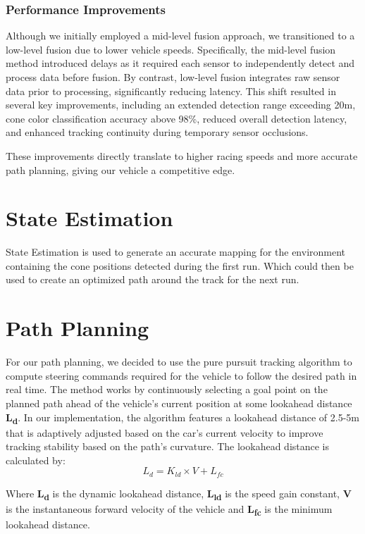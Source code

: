\documentclass[conference]{IEEEtran}
\begin{document}
\subsubsection{Performance Improvements}
Although we initially employed a mid-level fusion approach, we transitioned to a low-level fusion due to lower vehicle speeds. Specifically, the mid-level fusion method introduced delays as it required each sensor to independently detect and process data before fusion. By contrast, low-level fusion integrates raw sensor data prior to processing, significantly reducing latency. This shift resulted in several key improvements, including an extended detection range exceeding 20m, cone color classification accuracy above 98\%, reduced overall detection latency, and enhanced tracking continuity during temporary sensor occlusions.

These improvements directly translate to higher racing speeds and more accurate path planning, giving our vehicle a competitive edge.

\section{State Estimation}
State Estimation is used to generate an accurate mapping for the environment containing the cone positions detected during the first run. Which could then be used to create an optimized path around the track for the next run.

\section{Path Planning}
For our path planning, we decided to use the pure pursuit tracking algorithm to compute steering commands required for the vehicle to follow the desired path in real time. The method works by continuously selecting a goal point on the planned path ahead of the vehicle's current position at some lookahead distance \textbf{L\textsubscript{d}}. In our implementation, the algorithm features a lookahead distance of 2.5-5m that is adaptively adjusted based on the car's current velocity to improve tracking stability based on the path's curvature. The lookahead distance is calculated by:
\begin{equation}
L_d = K_{ld} \times V + L_{fc}
\end{equation}

Where \textbf{L\textsubscript{d}} is the dynamic lookahead distance, \textbf{L\textsubscript{ld}} is the speed gain constant, \textbf{V} is the instantaneous forward velocity of the vehicle and \textbf{L\textsubscript{fc}} is the minimum lookahead distance. 
\end{document}
